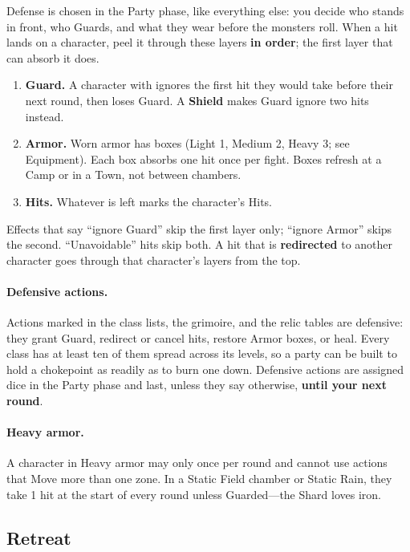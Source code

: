 Defense is chosen in the Party phase, like everything else: you decide who stands in front, who Guards, and what they wear before the monsters roll. When a hit lands on a character, peel it through these layers \textbf{in order}; the first layer that can absorb it does.

\begin{enumerate}
    \item \textbf{Guard.} A character with  ignores the first hit they would take before their next round, then loses Guard. A \textbf{Shield} makes Guard ignore two hits instead.
    \item \textbf{Armor.} Worn armor has  boxes (Light 1, Medium 2, Heavy 3; see Equipment). Each box absorbs one hit once per fight. Boxes refresh at a Camp or in a Town, not between chambers.
    \item \textbf{Hits.} Whatever is left marks the character's Hits.
\end{enumerate}

Effects that say ``ignore Guard'' skip the first layer only; ``ignore Armor'' skips the second. ``Unavoidable'' hits skip both. A hit that is \textbf{redirected} to another character goes through that character's layers from the top.

\paragraph{Defensive actions.}
Actions marked  in the class lists, the grimoire, and the relic tables are defensive: they grant Guard, redirect or cancel hits, restore Armor boxes, or heal. Every class has at least ten of them spread across its levels, so a party can be built to hold a chokepoint as readily as to burn one down. Defensive actions are assigned dice in the Party phase and last, unless they say otherwise, \textbf{until your next round}.

\paragraph{Heavy armor.}
A character in Heavy armor may  only once per round and cannot use actions that Move more than one zone. In a Static Field chamber or Static Rain, they take 1 hit at the start of every round unless Guarded---the Shard loves iron.

\subsection{Retreat}

